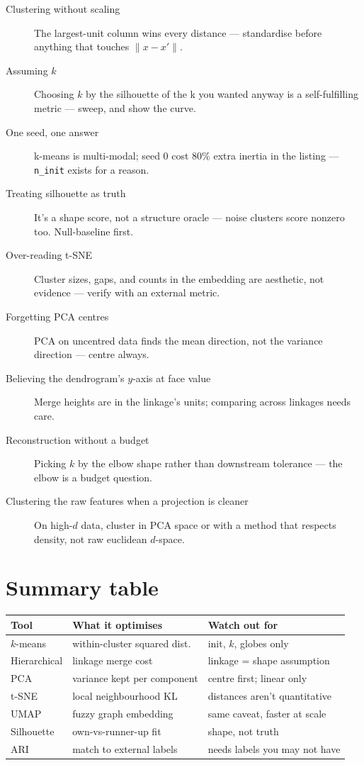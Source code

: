 \begin{description}
\item[Clustering without scaling] The largest-unit column wins every
  distance --- standardise before anything that touches $\|x - x'\|$.
\item[Assuming $k$] Choosing $k$ by the silhouette of the k you wanted
  anyway is a self-fulfilling metric --- sweep, and show the curve.
\item[One seed, one answer] k-means is multi-modal; seed 0 cost $80\%$
  extra inertia in the listing --- \texttt{n\_init} exists for a reason.
\item[Treating silhouette as truth] It's a shape score, not a structure
  oracle --- noise clusters score nonzero too. Null-baseline first.
\item[Over-reading t-SNE] Cluster sizes, gaps, and counts in the
  embedding are aesthetic, not evidence --- verify with an external
  metric.
\item[Forgetting PCA centres] PCA on uncentred data finds the mean
  direction, not the variance direction --- centre always.
\item[Believing the dendrogram's $y$-axis at face value] Merge heights
  are in the linkage's units; comparing across linkages needs care.
\item[Reconstruction without a budget] Picking $k$ by the elbow shape
  rather than downstream tolerance --- the elbow is a budget question.
\item[Clustering the raw features when a projection is cleaner] On
  high-$d$ data, cluster in PCA space or with a method that respects
  density, not raw euclidean $d$-space.
\end{description}

\section{Summary table}

\begin{tabularx}{\linewidth}{@{}l l X@{}}
\toprule
\textbf{Tool} & \textbf{What it optimises} & \textbf{Watch out for}\\
\midrule
$k$-means & within-cluster squared dist.\ & init, $k$, globes only\\
Hierarchical & linkage merge cost & linkage = shape assumption\\
PCA & variance kept per component & centre first; linear only\\
t-SNE & local neighbourhood KL & distances aren't quantitative\\
UMAP & fuzzy graph embedding & same caveat, faster at scale\\
Silhouette & own-vs-runner-up fit & shape, not truth\\
ARI & match to external labels & needs labels you may not have\\
\bottomrule
\end{tabularx}

